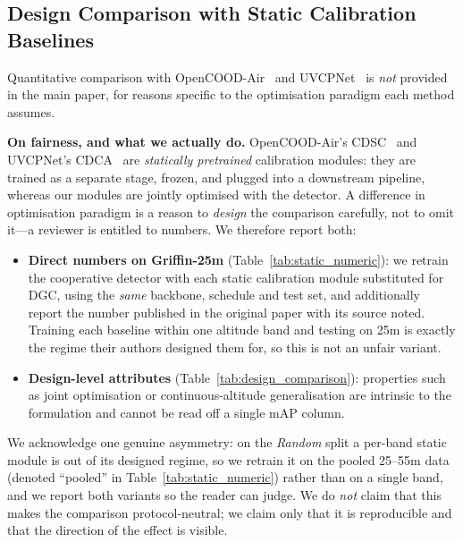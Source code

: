 \documentclass[9.5pt,twocolumn,a4paper]{IEEEtran}
\begin{document}
\subsection{Design Comparison with Static Calibration Baselines}
\label{sec:design_comparison}

Quantitative comparison with OpenCOOD-Air~\cite{opencood_air} and UVCPNet~\cite{uvcpnet} is \emph{not} provided in the main paper, for reasons specific to the optimisation paradigm each method assumes.

\noindent\textbf{On fairness, and what we actually do.} OpenCOOD-Air's CDSC~\cite{opencood_air} and UVCPNet's CDCA~\cite{uvcpnet} are \emph{statically pretrained} calibration modules: they are trained as a separate stage, frozen, and plugged into a downstream pipeline, whereas our modules are jointly optimised with the detector. A difference in optimisation paradigm is a reason to \emph{design} the comparison carefully, not to omit it---a reviewer is entitled to numbers. We therefore report both:

\begin{itemize}
    \item \textbf{Direct numbers on Griffin-25m} (Table~\ref{tab:static_numeric}): we retrain the cooperative detector with each static calibration module substituted for DGC, using the \emph{same} backbone, schedule and test set, and additionally report the number published in the original paper with its source noted. Training each baseline within one altitude band and testing on 25m is exactly the regime their authors designed them for, so this is not an unfair variant.
    \item \textbf{Design-level attributes} (Table~\ref{tab:design_comparison}): properties such as joint optimisation or continuous-altitude generalisation are intrinsic to the formulation and cannot be read off a single mAP column.
\end{itemize}

\noindent We acknowledge one genuine asymmetry: on the \emph{Random} split a per-band static module is out of its designed regime, so we retrain it on the pooled 25--55m data (denoted ``pooled'' in Table~\ref{tab:static_numeric}) rather than on a single band, and we report both variants so the reader can judge. We do \emph{not} claim that this makes the comparison protocol-neutral; we claim only that it is reproducible and that the direction of the effect is visible.
\end{document}
